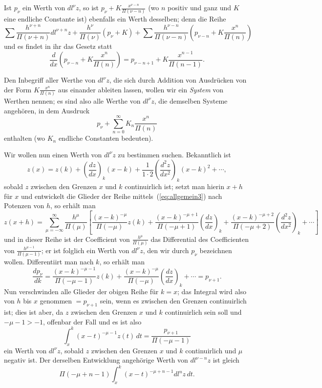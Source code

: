 \documentclass[12pt,a4paper]{article}
\begin{document}
Ist $p_\nu$ ein Werth von $dl^\nu z$, so ist $p_\nu + K \frac{x^{\nu-n}}{\Pi(\nu-n)}$ (wo $n$ positiv und ganz und $K$ eine endliche Constante ist) ebenfalls ein Werth desselben; denn die Reihe
\[
\sum \frac{h^{\nu+n}}{\Pi(\nu+n)} dl^{\nu+n}z + \frac{h^\nu}{\Pi(\nu)}(p_\nu + K) + \sum \frac{h^{\nu-n}}{\Pi(\nu-n)}\left(p_{\nu-n} + K\frac{x^n}{\Pi(n)}\right)
\]
und es findet in ihr das Gesetz statt
\[
\frac{d}{dx}\left(p_{\nu-n} + K\frac{x^n}{\Pi(n)}\right) = p_{\nu-n+1} + K\frac{x^{n-1}}{\Pi(n-1)}.
\]

Den Inbegriff aller Werthe von $dl^\nu z$, die sich durch Addition von Ausdr\"ucken von der Form $K \frac{x^n}{\Pi(n)}$ aus einander ableiten lassen, wollen wir ein \emph{System} von Werthen nennen; es sind also alle Werthe von $dl^\nu z$, die demselben Systeme angeh\"oren, in dem Ausdruck
\begin{equation}
p_\nu + \sum_{n=0}^{\infty} K_n \frac{x^n}{\Pi(n)}
\end{equation}
enthalten (wo $K_n$ endliche Constanten bedeuten).

Wir wollen nun einen Werth von $dl^\nu z$ zu bestimmen suchen. Bekanntlich ist
\[
z(x) = z(k) + \left(\frac{dz}{dx}\right)_{\!k}(x-k) + \frac{1}{1 \cdot 2}\left(\frac{d^2z}{dx^2}\right)_{\!k}(x-k)^2 + \cdots,
\]
sobald $z$ zwischen den Grenzen $x$ und $k$ continuirlich ist; setzt man hierin $x+h$ f\"ur $x$ und entwickelt die Glieder der Reihe mittels~(\ref{eq:allgemein3}) nach Potenzen von $h$, so erh\"alt man
\[
z(x+h) = \sum_{\mu=-\infty}^{\infty} \frac{h^\mu}{\Pi(\mu)} \left[ \frac{(x-k)^{-\mu}}{\Pi(-\mu)}z(k) + \frac{(x-k)^{-\mu+1}}{\Pi(-\mu+1)}\left(\frac{dz}{dx}\right)_{\!k} + \frac{(x-k)^{-\mu+2}}{\Pi(-\mu+2)}\left(\frac{d^2z}{dx^2}\right)_{\!k} + \cdots \right]
\]
und in dieser Reihe ist der Coefficient von $\frac{h^\mu}{\Pi(\mu)}$ das Differential des Coefficienten von $\frac{h^{\mu-1}}{\Pi(\mu-1)}$; er ist folglich ein Werth von $dl^\nu z$, den wir durch $p_\nu$ bezeichnen wollen. Differentiirt man nach $k$, so erh\"alt man
\[
\frac{dp_\nu}{dk} = \frac{(x-k)^{-\mu-1}}{\Pi(-\mu-1)}z(k) + \frac{(x-k)^{-\mu}}{\Pi(-\mu)}\left(\frac{dz}{dx}\right)_{\!k} + \cdots = p_{\nu+1}.
\]
Nun verschwinden alle Glieder der obigen Reihe f\"ur $k=x$; das Integral wird also von $h$ bis $x$ genommen $= p_{\nu+1}$ sein, wenn es zwischen den Grenzen continuirlich ist; dies ist aber, da $z$ zwischen den Grenzen $x$ und $k$ continuirlich sein soll und $-\mu-1 > -1$, offenbar der Fall und es ist also
\begin{equation}
\int_x^k (x-t)^{-\mu-1}z(t)\,dt = \frac{p_{\nu+1}}{\Pi(-\mu-1)}
\end{equation}
ein Werth von $dl^\nu z$, sobald $z$ zwischen den Grenzen $x$ und $k$ continuirlich und $\mu$ negativ ist. Der derselben Entwicklung angeh\"orige Werth von $dl^{\nu-n}z$ ist gleich
\[
\Pi(-\mu+n-1) \int_x^k (x-t)^{-\mu+n-1}dl^n z\,dt.
\]
\end{document}
